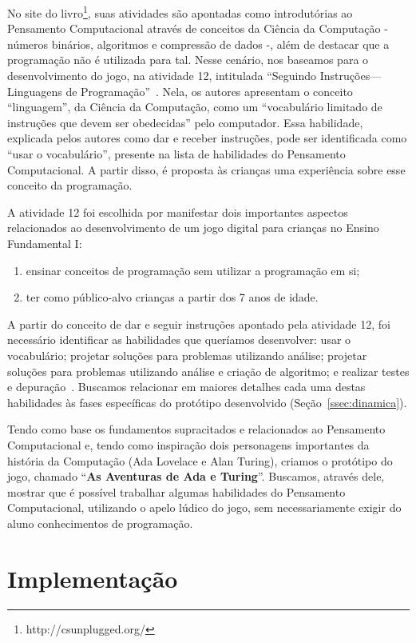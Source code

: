 No site do livro\footnote{http://csunplugged.org/}, suas atividades são apontadas como introdutórias ao Pensamento Computacional através de conceitos da Ciência da Computação - números binários, algoritmos e compressão de dados -, além de destacar que a programação não é utilizada para tal. Nesse cenário, nos baseamos para o desenvolvimento do jogo, na atividade 12, intitulada “Seguindo Instruções—Linguagens de Programação”~\cite[~p.101]{bell_computer_2011}. Nela, os autores apresentam o conceito “linguagem”, da Ciência da Computação, como um “vocabulário limitado de instruções que devem ser obedecidas” pelo computador. Essa habilidade, explicada pelos autores como dar e receber instruções, pode ser identificada como “usar o vocabulário”, presente na lista de habilidades do Pensamento Computacional. A partir disso, é proposta às crianças uma experiência sobre esse conceito da programação.

A atividade 12 foi escolhida por manifestar dois importantes aspectos relacionados ao desenvolvimento de um jogo digital para crianças no Ensino Fundamental I:

\begin{enumerate}
	\item ensinar conceitos de programação sem utilizar a programação em si;
	\item ter como público-alvo crianças a partir dos 7 anos de idade.
\end{enumerate}

A partir do conceito de dar e seguir instruções apontado pela atividade 12, foi necessário identificar as habilidades que queríamos desenvolver: usar o vocabulário; projetar soluções para problemas utilizando análise; projetar soluções para problemas utilizando análise e criação de algoritmo; e realizar testes e depuração~\cite{barr_bringing_2011}. Buscamos relacionar em maiores detalhes cada uma destas habilidades às fases específicas do protótipo desenvolvido (Seção~\ref{ssec:dinamica}).

Tendo como base os fundamentos supracitados e relacionados ao Pensamento Computacional e, tendo como inspiração dois personagens importantes da história da Computação (Ada Lovelace e Alan Turing), criamos o protótipo do jogo, chamado “\textbf{As Aventuras de Ada e Turing}”. Buscamos, através dele, mostrar que é possível trabalhar algumas habilidades do Pensamento Computacional, utilizando o apelo lúdico do jogo, sem necessariamente exigir do aluno conhecimentos de programação.

\section{Implementação} \label{sec:implementacao}

